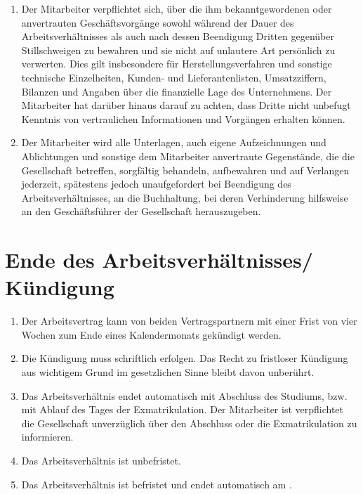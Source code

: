 \documentclass[twoside,a4paper]{scrreprt}
\begin{document}
\centerline{ }
\begin{enumerate}[label=(\alph*)]
	\item Der Mitarbeiter verpflichtet sich, über die ihm bekanntgewordenen oder anvertrauten Geschäftsvorgänge sowohl während der Dauer des Arbeitsverhältnisses als auch nach dessen Beendigung Dritten gegenüber Stillschweigen zu bewahren und sie nicht auf unlautere Art persönlich zu verwerten. Dies gilt insbesondere für Herstellungsverfahren und sonstige technische Einzelheiten, Kunden- und Lieferantenlisten, Umsatzziffern, Bilanzen und Angaben über die finanzielle Lage des Unternehmens. Der Mitarbeiter hat darüber hinaus darauf zu achten, dass Dritte nicht unbefugt Kenntnis von vertraulichen Informationen und Vorgängen erhalten können.
	\item Der Mitarbeiter wird alle Unterlagen, auch eigene Aufzeichnungen und Ablichtungen und sonstige dem Mitarbeiter anvertraute Gegenstände, die die Gesellschaft betreffen, sorgfältig behandeln, aufbewahren und auf Verlangen jederzeit, spätestens jedoch unaufgefordert bei Beendigung des Arbeitsverhältnisses, an die Buchhaltung, bei deren Verhinderung hilfsweise an den Geschäftsführer der Gesellschaft herauszugeben.
\end{enumerate}

\section{Ende des Arbeitsverhältnisses/ Kündigung}

\centerline{ }
\begin{enumerate}[label=(\alph*)]
	\item Der Arbeitsvertrag kann von beiden Vertragspartnern mit einer Frist von vier Wochen zum Ende eines Kalendermonats gekündigt werden.
	\item Die Kündigung muss schriftlich erfolgen. Das Recht zu fristloser Kündigung aus wichtigem Grund im gesetzlichen Sinne bleibt davon unberührt.
	\ifdefined\istStudent
	    \item Das Arbeitsverhältnis endet automatisch mit Abschluss des Studiums, bzw. mit Ablauf des Tages der Exmatrikulation. Der Mitarbeiter ist verpflichtet die Gesellschaft unverzüglich über den Abschluss oder die Exmatrikulation zu informieren.
	\fi
	\ifdefined\istUnbefristet
	    \item Das Arbeitsverhältnis ist unbefristet.
	\else
	    \item Das Arbeitsverhältnis ist befristet und endet automatisch am \Ende.
	\fi
\end{enumerate}
\end{document}
